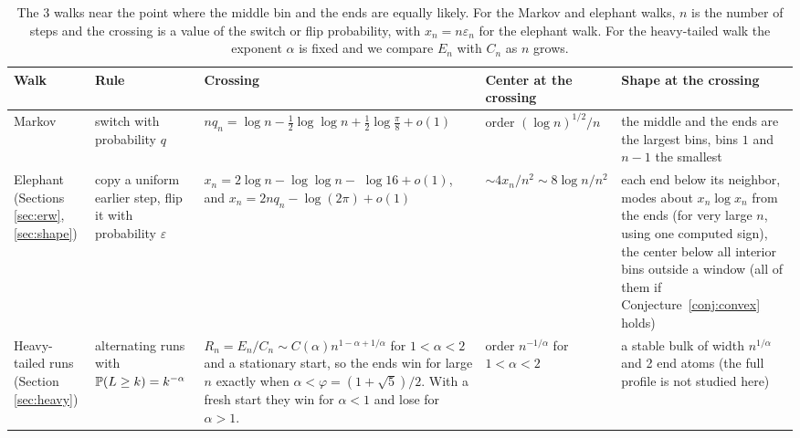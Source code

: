 \begin{table}[t]
\centering\small
\setlength{\tabcolsep}{4pt}
\begin{tabular}{@{}>{\raggedright\arraybackslash}p{1.65cm}
 >{\raggedright\arraybackslash}p{2.35cm}
 >{\raggedright\arraybackslash}p{4.9cm}
 >{\raggedright\arraybackslash}p{1.9cm}
 >{\raggedright\arraybackslash}p{4.3cm}@{}}
\toprule
Walk & Rule & Crossing & Center at the crossing & Shape at the crossing\\
\midrule
Markov \cite{paperA}
 & switch with probability $q$
 & $nq_n=\log n-\frac12\log\log n+\frac12\log\frac\pi8+o(1)$
 & order $(\log n)^{1/2}/n$
 & the middle and the ends are the largest bins, bins $1$ and $n-1$ the
 smallest\\
\addlinespace
Elephant (Sections \ref{sec:erw}, \ref{sec:shape})
 & copy a uniform earlier step, flip it with probability $\varepsilon$
 & $x_n=2\log n-\log\log n-{}$\newline
 $\log16+o(1)$, and\newline
 $x_n=2nq_n-\log(2\pi)+o(1)$
 & $\sim4x_n/n^2\sim8\log n/n^2$
 & each end below its neighbor, modes about $x_n\log x_n$ from the ends
 (for very large $n$, using one computed sign), the center below all
 interior bins outside a window (all of them if
 Conjecture~\ref{conj:convex} holds)\\
\addlinespace
Heavy-tailed runs (Section \ref{sec:heavy})
 & alternating runs with $\mathbb{P}(L\ge k)=k^{-\alpha}$
 & $R_n=E_n/C_n\sim C(\alpha)n^{1-\alpha+1/\alpha}$ for $1<\alpha<2$ and
 a stationary start, so the ends win for large $n$ exactly when
 $\alpha<\varphi=(1+\sqrt5)/2$. With a fresh start they win for $\alpha<1$ and lose for
 $\alpha>1$.
 & order $n^{-1/\alpha}$ for $1<\alpha<2$
 & a stable bulk of width $n^{1/\alpha}$ and 2 end atoms
 \cite{godrecheluck2001,zdk2015} (the full profile is not studied here)\\
\bottomrule
\end{tabular}
\caption{The 3 walks near the point where the middle bin and the ends
are equally likely. For the Markov and elephant walks, $n$ is the number of
steps and the crossing is a value of the switch or flip probability, with
$x_n=n\varepsilon_n$ for the elephant walk. For the heavy-tailed walk the
exponent $\alpha$ is fixed and we compare $E_n$ with $C_n$ as $n$ grows.}
\label{tab:compare}
\end{table}

